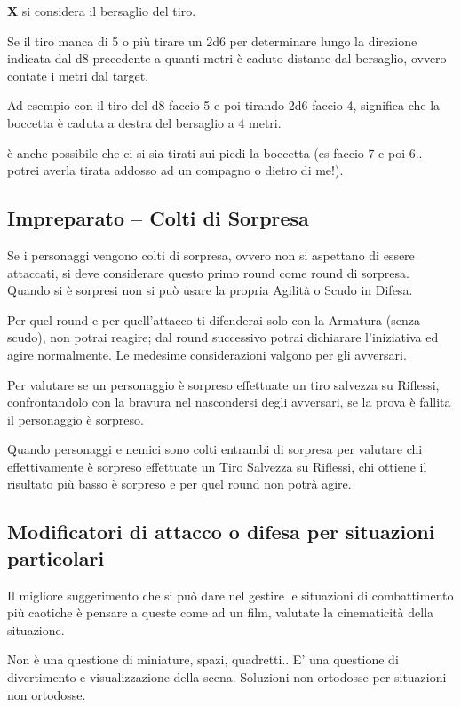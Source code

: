 \documentclass[a4paper,11pt,twoside,openany]{book}
\begin{document}
\textbf{X} si considera il bersaglio del tiro.

Se il tiro manca di 5 o più tirare un 2d6 per determinare lungo la direzione indicata dal d8 precedente a quanti metri è caduto distante dal bersaglio, ovvero contate i metri dal target.

Ad esempio con il tiro del d8 faccio 5 e poi tirando 2d6 faccio 4, significa che la boccetta è caduta a destra del bersaglio a 4 metri.

è anche possibile che ci si sia tirati sui piedi la boccetta (es faccio 7 e poi 6.. potrei averla tirata addosso ad un compagno o dietro di me!).

\subsection{Impreparato -- Colti di Sorpresa}

Se i personaggi vengono colti di sorpresa, ovvero non si aspettano di essere attaccati, si deve considerare questo primo round come round di sorpresa. Quando si è sorpresi non si può usare la propria Agilità o Scudo in Difesa.

Per quel round e per quell'attacco ti difenderai solo con la Armatura (senza scudo), non potrai reagire; dal round successivo potrai dichiarare l'iniziativa ed agire normalmente. Le medesime considerazioni valgono per gli avversari.

Per valutare se un personaggio è sorpreso effettuate un tiro salvezza su Riflessi, confrontandolo con la bravura nel nascondersi degli avversari, se la prova è fallita il personaggio è sorpreso.

Quando personaggi e nemici sono colti entrambi di sorpresa per valutare chi effettivamente è sorpreso effettuate un Tiro Salvezza su Riflessi, chi ottiene il risultato più basso è sorpreso e per quel round non potrà agire.

\subsection{Modificatori di attacco o difesa per situazioni particolari} 

Il migliore suggerimento che si può dare nel gestire le situazioni di combattimento più caotiche è pensare a queste come ad un film, valutate la cinematicità della situazione.

Non è una questione di miniature, spazi, quadretti.. E' una questione di divertimento e visualizzazione della scena. Soluzioni non ortodosse per situazioni non ortodosse.
\end{document}
